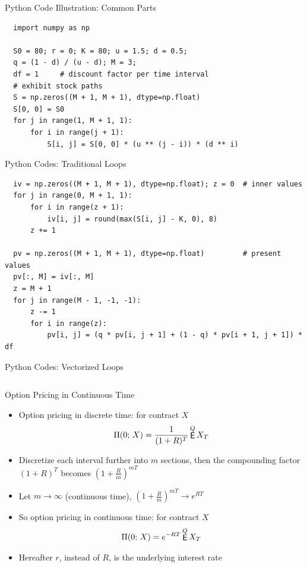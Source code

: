 \documentclass[10pt,handout]{beamer}
\DeclareMathOperator\expc{{\sf E}}
\theoremstyle{definition}
\begin{document}
\begin{frame}[fragile]{Python Code Illustration: Common Parts}
  \begin{verbatim}
  import numpy as np
  
  S0 = 80; r = 0; K = 80; u = 1.5; d = 0.5; 
  q = (1 - d) / (u - d); M = 3; 
  df = 1     # discount factor per time interval
  # exhibit stock paths
  S = np.zeros((M + 1, M + 1), dtype=np.float)  
  S[0, 0] = S0
  for j in range(1, M + 1, 1):
      for i in range(j + 1):
          S[i, j] = S[0, 0] * (u ** (j - i)) * (d ** i)
  \end{verbatim}
\end{frame}
  
\begin{frame}[fragile]{Python Codes: Traditional Loops}
  \begin{verbatim}
  iv = np.zeros((M + 1, M + 1), dtype=np.float); z = 0  # inner values
  for j in range(0, M + 1, 1):
      for i in range(z + 1):
          iv[i, j] = round(max(S[i, j] - K, 0), 8)
      z += 1
  
  pv = np.zeros((M + 1, M + 1), dtype=np.float)         # present values
  pv[:, M] = iv[:, M]
  z = M + 1
  for j in range(M - 1, -1, -1):
      z -= 1
      for i in range(z):
          pv[i, j] = (q * pv[i, j + 1] + (1 - q) * pv[i + 1, j + 1]) * df
  \end{verbatim}
\end{frame}

\begin{frame}{Python Codes: Vectorized Loops}
  \inputminted[fontsize=\footnotesize,linenos=true]{python}{fig/note08/binomial_vec.py}
\end{frame}

\begin{frame}{Option Pricing in Continuous Time}
  \begin{itemize}
    \item Option pricing in discrete time: for contract $X$ 
      \begin{align*}
        \Pi(0;\,X) = \frac{1}{(1 + R)^T}\expc^Q{X_T}
      \end{align*}
    \item Discretize each interval further into $m$ sections, then the compounding factor $(1 + R)^T$ becomes $(1 + \frac{R}m)^{mT}$
    \item Let $m\to\infty$ (continuous time), $(1 + \frac{R}m)^{mT}\to e^{RT}$
    \item So option pricing in continuous time: for contract $X$ 
      \begin{align*}
        \Pi(0;\,X) = e^{-RT}\expc^Q{X_T}
      \end{align*}
    \item Hereafter $r$, instead of $R$, is the underlying interest rate 
  \end{itemize}
\end{frame}
\end{document}
